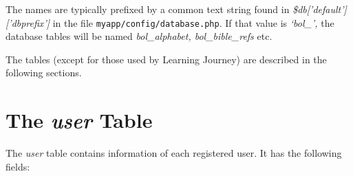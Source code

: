 \documentclass[11pt,oneside,a4paper]{memoir}
\newcommand{\q}{{\mainnolig '}}
\begin{document}
The names are typically prefixed by a common text string found in
\emph{\$db[\q default\q][\q dbprefix\q]} in the file \texttt{myapp/config/database.php}. If that
value is \emph{`bol\_',} the database tables will be named \emph{bol\_alphabet,
  bol\_bible\_refs} etc.

The tables (except for those used by Learning Journey) are described in the following sections.

\section{The \emph{user} Table}\label{sec-user-table}

The \emph{user} table contains information of each registered user. It has the following fields:
\end{document}
